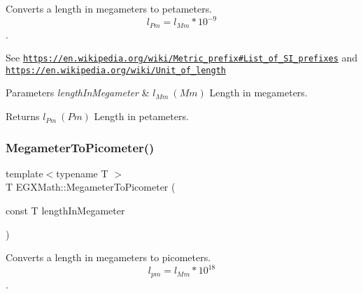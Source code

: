 Converts a length in megameters to petameters. \[ l_{Pm}=l_{Mm} * 10^{-9} \]. 

See \href{https://en.wikipedia.org/wiki/Metric_prefix#List_of_SI_prefixes}{\tt https\+://en.\+wikipedia.\+org/wiki/\+Metric\+\_\+prefix\#\+List\+\_\+of\+\_\+\+S\+I\+\_\+prefixes} and \href{https://en.wikipedia.org/wiki/Unit_of_length}{\tt https\+://en.\+wikipedia.\+org/wiki/\+Unit\+\_\+of\+\_\+length} 
\begin{DoxyParams}{Parameters}
{\em length\+In\+Megameter} & $ l_{Mm}\ (Mm)$ Length in megameters. \\
\hline
\end{DoxyParams}
\begin{DoxyReturn}{Returns}
$ l_{Pm}\ (Pm)$ Length in petameters. 
\end{DoxyReturn}
\mbox{\label{group___e_g_x_math-_conversions-_length_conversions-_megameter-_s_i_ga0f6585bdcd16b6748b6c4d9116dd955c}} 
\subsubsection{\texorpdfstring{Megameter\+To\+Picometer()}{MegameterToPicometer()}}
{\footnotesize\ttfamily template$<$typename T $>$ \\
T E\+G\+X\+Math\+::\+Megameter\+To\+Picometer (\begin{DoxyParamCaption}\item[{const T}]{length\+In\+Megameter }\end{DoxyParamCaption})}



Converts a length in megameters to picometers. \[ l_{pm}=l_{Mm} * 10^{18} \]. 


